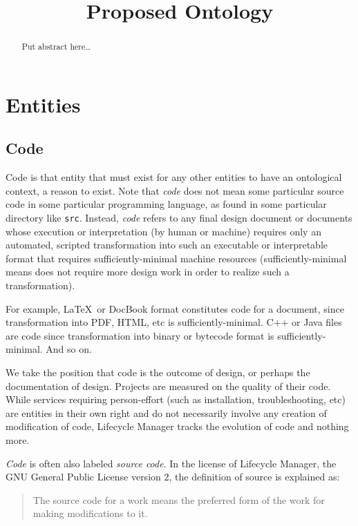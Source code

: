 \documentclass{article}
\title{Proposed Ontology}
\begin{document}
\maketitle

\tableofcontents

\begin{abstract}
Put abstract here\ldots
\end{abstract}





\section{Entities}


\subsection{Code}

Code is that entity that must exist for any other entities to have an ontological
context, a reason to exist. Note that \textit{code} does not mean some
particular source code in some particular programming language, as found in some
particular directory like \texttt{src}. Instead, \textit{code} refers to any
final design document or documents whose execution or interpretation (by human
or machine) requires only an automated, scripted transformation into such an
executable or interpretable format that requires
sufficiently-minimal machine resources (sufficiently-minimal means does not
require more design work in order to realize such a transformation).

For example, \LaTeX\ or DocBook format constitutes code for a document, since
transformation into PDF, HTML, etc is sufficiently-minimal. C++ or Java files
are code since transformation into binary or bytecode format is
sufficiently-minimal. And so on.

We take the position that code is the outcome of design, or perhaps the
documentation of design. Projects are measured on the quality of their code.
While services requiring person-effort (such as installation, troubleshooting,
etc) are entities in their own right and do not necessarily involve any creation of
modification of code, Lifecycle Manager tracks the evolution of code and nothing
more. 

\textit{Code} is often also labeled \textit{source code}. In the license of
Lifecycle
Manager, the GNU General Public License version 2, the definition of source is
explained as:
\begin{quote}
The source code for a work means the preferred form of the work for
making modifications to it.
\end{quote}
\end{document}
